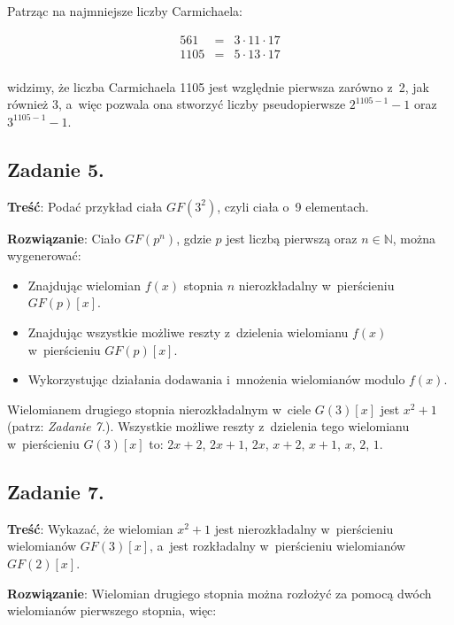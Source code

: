 \documentclass[a4paper,10pt, twocolumn]{article}
\begin{document}
Patrząc na najmniejsze liczby Carmichaela:

\begin{equation*}
	\begin{array}{lcl} 561& = & 3 \cdot 11 \cdot 17 \\ 1105 & = & 5 \cdot 13 \cdot 17 \\ \end{array}
\end{equation*}

\noindent widzimy, że liczba Carmichaela 1105 jest względnie pierwsza zarówno z~2, jak również 3, a~więc pozwala ona stworzyć liczby pseudopierwsze $2^{1105 - 1} - 1$ oraz $3^{1105 - 1} - 1$.

\subsection{Zadanie 5.}

\textbf{Treść}: Podać przykład ciała $GF(3^{2})$, czyli ciała o~9 elementach.

\textbf{Rozwiązanie}: Ciało $GF(p^{n})$, gdzie $p$ jest liczbą pierwszą oraz $n \in \mathbb{N}$, można wygenerować:

\begin{itemize}
 \item Znajdując wielomian $f(x)$ stopnia $n$ nierozkładalny w~pierścieniu $GF(p)[x]$.
 \item Znajdując wszystkie możliwe reszty z~dzielenia wielomianu $f(x)$ w~pierścieniu $GF(p)[x]$.
 \item Wykorzystując działania dodawania i~mnożenia wielomianów modulo $f(x)$.
\end{itemize}

Wielomianem drugiego stopnia nierozkładalnym w~ciele $G(3)[x]$ jest $x^2 + 1$ (patrz: \emph{Zadanie 7.}). Wszystkie możliwe reszty z~dzielenia tego wielomianu w~pierścieniu $G(3)[x]$ to: $2x + 2$, $2x + 1$, $2x$, $x + 2$, $x + 1$, $x$, $2$, $1$.

\subsection{Zadanie 7.}

\textbf{Treść}: Wykazać, że wielomian $x^{2} + 1$ jest nierozkładalny w~pierścieniu wielomianów $GF(3)[x]$, a~jest rozkładalny w~pierścieniu wielomianów $GF(2)[x]$.

\textbf{Rozwiązanie}: Wielomian drugiego stopnia można rozłożyć za pomocą dwóch wielomianów pierwszego stopnia, więc:
\end{document}
